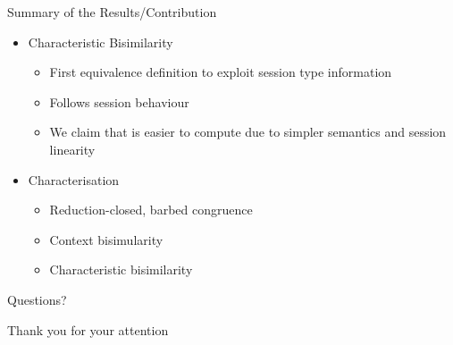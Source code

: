 \documentclass{beamer}
\begin{document}
	\begin{frame}{Summary of the Results/Contribution}
		\begin{itemize}
			\item	Characteristic Bisimilarity
				\begin{itemize}
					\item	First equivalence definition to exploit session type information
					\item	Follows session behaviour
					\item	We claim that is easier to compute due to simpler semantics and session linearity
				\end{itemize}

			\item	Characterisation
				\begin{itemize}
					\item	Reduction-closed, barbed congruence
					\item	Context bisimularity
					\item	Characteristic bisimilarity
				\end{itemize}

		\end{itemize}
	\end{frame}

	\begin{frame}{Questions?}
		\begin{center}
			\huge Thank you for your attention
		\end{center}
	\end{frame}
\end{document}
